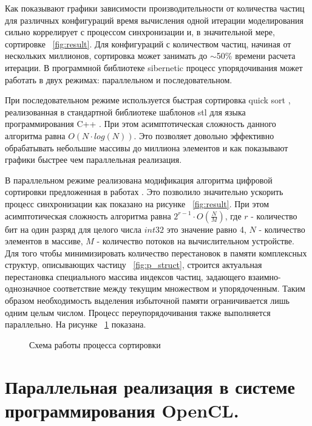 Как показывают графики зависимости производительности от количества частиц для различных конфигураций время вычисления одной итерации моделирования сильно коррелирует с процессом синхронизации и, в значительной мере, сортировке ~\ref{fig:result}. Для  конфигураций с количеством частиц, начиная от нескольких миллионов, сортировка может занимать до \(\sim \)50\% времени расчета итерации. В программной библиотеке sibernetic \cite{Palyanov2016} процесс упорядочивания может работать в двух режимах: параллельном и последовательном.

При последовательном режиме используется быстрая сортировка quick sort \cite{Hoare1962}, реализованная в стандартной библиотеке шаблонов stl \cite{Stepanov1995} для языка программирования C++ \cite{Stroustrup2013}. При этом асимптотическая сложность данного алгоритма равна \( O(N \cdot log(N)) \). Это позволяет довольно эффективно обрабатывать небольшие массивы до миллиона элементов и как показывают графики быстрее чем параллельная реализация.

В параллельном режиме реализована модификация алгоритма цифровой сортировки предложенная в работах \cite{Knuth1998, Marcho1991}. Это позволило значительно ускорить процесс синхронизации как показано на рисунке ~\ref{fig:result}. При этом асимптотическая сложность алгоритма равна \( 2^{r-1} \cdot O(\frac{N}{M}) \), где \( r \) - количество бит на один разряд для целого числа \( int32 \) это значение равно 4, \( N \) - количество элементов в массиве, \( M \) - количество потоков на вычислительном устройстве. Для того чтобы минимизировать количество перестановок в памяти комплексных структур, описывающих частицу ~\ref{fig:p_struct}, строится актуальная перестановка специального массива  индексов частиц, задающего взаимно-однозначное соответствие между текущим множеством и упорядоченным. Таким образом необходимость выделения избыточной памяти ограничивается лишь одним целым числом.
Процесс переупорядочивания также выполняется параллельно. На рисунке ~\ref{fig:sort1} показана.
\begin{figure}[ht]
  \caption{Схема работы процесса сортировки}\label{fig:sort1}
\end{figure}

\section{Параллельная реализация в системе программирования OpenCL.}\label{sec:ch3/sect3}

